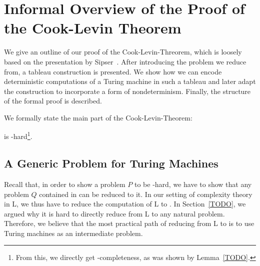 \newcommand*{\gennp}{\textbf{TMGenNP}}

\newcommand{\strent}{\rightsquigarrow}
\newcommand{\Rfinal}{R_{\text{final}}}


\newcommand{\BPR}{\textbf{BinaryPR}}
\newcommand{\fsat}{\textbf{FSAT}}
\newcommand{\sat}{\textbf{SAT}}

\newcommand{\rewwin}[2]{
  \begin{tabular}{C|C|C}
    #1 \\ 
    \midrule #2
  \end{tabular}
}

\newcommand{\blank}{\textbf{\textvisiblespace}}
\newcommand{\delim}{\#}

\newcommand{\polarity}{\textsf{polarity}}


\newcommand*{\TallestContent}{\ensuremath{b}}%

\newcommand{\polneg}[1]{\overleftarrow{#1\vphantom{\TallestContent}}}
\newcommand{\polpos}[1]{\overrightarrow{#1\vphantom{\TallestContent}}}
\newcommand{\polneut}[1]{\overline{#1\vphantom{\TallestContent}}}

\newcommand{\reprt}[1]{\ensuremath{\sim_t^{#1}}}
\newcommand{\reprtt}[2]{\ensuremath{\sim_t^{(#1, #2)}}}
\newcommand{\reprc}{\ensuremath{\sim_c}}



\chapter{Informal Overview of the Proof of the Cook-Levin Theorem}\label{chap:informaloverview}
We give an outline of our proof of the Cook-Levin-Threorem, which is loosely based on the presentation by Sipser~\cite{Sipser:TheoryofComputation}. After introducing the problem we reduce from, a tableau construction is presented. We show how we can encode deterministic computations of a Turing machine in such a tableau and later adapt the construction to incorporate a form of nondeterminism. Finally, the structure of the formal proof is described. 

We formally state the main part of the Cook-Levin-Theorem:
\begin{theorem}
  \SAT{} is \NP{}-hard\footnote{From this, we directly get \NP{}-completeness, as was shown by Lemma~\ref{TODO}.}.
\end{theorem}

\section{A Generic Problem for Turing Machines}
Recall that, in order to show a problem $P$ to be \NP{}-hard, we have to show that any problem $Q$ contained in \NP{} can be reduced to it. In our setting of complexity theory in L, we thus have to reduce the computation of L to \SAT{}.
In Section~\ref{TODO}, we argued why it is hard to directly reduce from L to any natural problem. 
Therefore, we believe that the most practical path of reducing from L to \SAT{} is to use Turing machines as an intermediate problem. 

